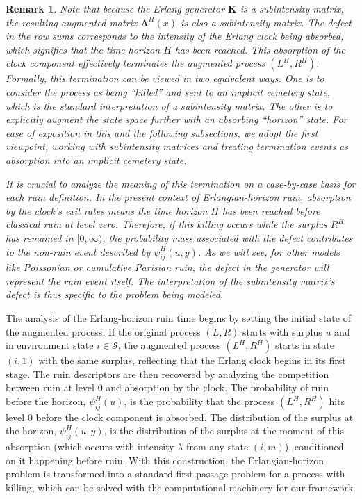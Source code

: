 \documentclass[11pt]{article}
\numberwithin{table}{section}
\numberwithin{figure}{section}
\numberwithin{equation}{section}
\newcommand{\1}{{\mathbf 1}}
\newcommand{\0}{\mat{0}}
\newtheorem{remark}{Remark}[section]
\begin{document}
\begin{remark}\label{Rem:temination-Erlang}
Note that because the Erlang generator \(\bm{K}\) is a subintensity matrix, the resulting augmented matrix \(\bm{\Lambda}^H(x)\) is also a subintensity matrix. The defect in the row sums corresponds to the intensity of the Erlang clock being absorbed, which signifies that the time horizon \(H\) has been reached. This absorption of the clock component effectively terminates the augmented process \((L^H, R^H)\). Formally, this termination can be viewed in two equivalent ways. One is to consider the process as being ``killed'' and sent to an implicit cemetery state, which is the standard interpretation of a subintensity matrix. The other is to explicitly augment the state space further with an absorbing ``horizon'' state. For ease of exposition in this and the following subsections, we adopt the first viewpoint, working with subintensity matrices and treating termination events as absorption into an implicit cemetery state.

It is crucial to analyze the meaning of this termination on a case-by-case basis for each ruin definition. In the present context of Erlangian-horizon ruin, absorption by the clock's exit rates means the time horizon \(H\) has been reached before classical ruin at level zero. Therefore, if this killing occurs while the surplus \(R^H\) has remained in \([0, \infty)\), the probability mass associated with the defect contributes to the non-ruin event described by \(\psi_{ij}^H(u, y)\). As we will see, for other models like Poissonian or cumulative Parisian ruin, the defect in the generator will represent the ruin event itself. The interpretation of the subintensity matrix's defect is thus specific to the problem being modeled.
\end{remark}

The analysis of the Erlang-horizon ruin time begins by setting the initial state of the augmented process. If the original process $(L,R)$ starts with surplus \(u\) and in environment state \(i \in \mathcal{S}\), the augmented process $(L^H,R^H)$ starts in state \((i,1)\) with the same surplus, reflecting that the Erlang clock begins in its first stage. The ruin descriptors are then recovered by analyzing the competition between ruin at level 0 and absorption by the clock. The probability of ruin before the horizon, \(\psi_{ij}^H(u)\), is the probability that the process \((L^H, R^H)\) hits level 0 before the clock component is absorbed. The distribution of the surplus at the horizon, \(\psi_{ij}^H(u, y)\), is the distribution of the surplus at the moment of this absorption (which occurs with intensity \(\lambda\) from any state \((i,m)\)), conditioned on it happening before ruin. With this construction, the Erlangian-horizon problem is transformed into a standard first-passage problem for a process with killing, which can be solved with the computational machinery for our framework.
\end{document}
